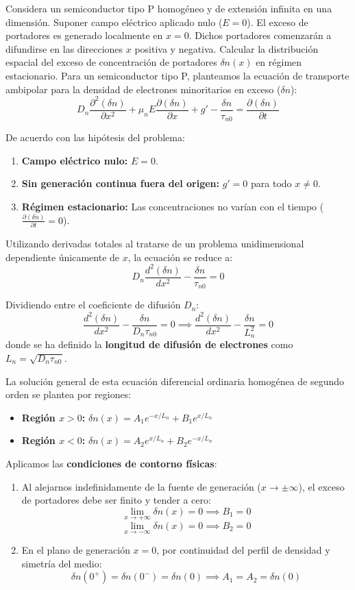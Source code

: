 \begin{ejemplo}
Considera un semiconductor tipo P homogéneo y de extensión infinita en una dimensión. Suponer campo eléctrico aplicado nulo ($E = 0$). El exceso de portadores es generado localmente en $x = 0$. Dichos portadores comenzarán a difundirse en las direcciones $x$ positiva y negativa. Calcular la distribución espacial del exceso de concentración de portadores $\delta n(x)$ en régimen estacionario.
\tcblower
Para un semiconductor tipo P, planteamos la ecuación de transporte ambipolar para la densidad de electrones minoritarios en exceso ($\delta n$):
\[
D_n \frac{\partial^2 (\delta n)}{\partial x^2} + \mu_n E \frac{\partial (\delta n)}{\partial x} + g' - \frac{\delta n}{\tau_{n0}} = \frac{\partial (\delta n)}{\partial t}
\]

De acuerdo con las hipótesis del problema:
\begin{enumerate}
    \item \textbf{Campo eléctrico nulo:} $E = 0$.
    \item \textbf{Sin generación continua fuera del origen:} $g' = 0$ para todo $x \neq 0$.
    \item \textbf{Régimen estacionario:} Las concentraciones no varían con el tiempo ($\frac{\partial (\delta n)}{\partial t} = 0$).
\end{enumerate}

Utilizando derivadas totales al tratarse de un problema unidimensional dependiente únicamente de $x$, la ecuación se reduce a:
\[
D_n \frac{d^2 (\delta n)}{dx^2} - \frac{\delta n}{\tau_{n0}} = 0
\]

Dividiendo entre el coeficiente de difusión $D_n$:
\[
\frac{d^2 (\delta n)}{dx^2} - \frac{\delta n}{D_n \tau_{n0}} = 0 \implies \frac{d^2 (\delta n)}{dx^2} - \frac{\delta n}{L_n^2} = 0
\]
donde se ha definido la \textbf{longitud de difusión de electrones} como $L_n = \sqrt{D_n \tau_{n0}}$.

La solución general de esta ecuación diferencial ordinaria homogénea de segundo orden se plantea por regiones:
\begin{itemize}
    \item \textbf{Región $x > 0$:} $\delta n(x) = A_1 e^{-x/L_n} + B_1 e^{x/L_n}$
    \item \textbf{Región $x < 0$:} $\delta n(x) = A_2 e^{x/L_n} + B_2 e^{-x/L_n}$
\end{itemize}

Aplicamos las \textbf{condiciones de contorno físicas}:
\begin{enumerate}
    \item Al alejarnos indefinidamente de la fuente de generación ($x \to \pm \infty$), el exceso de portadores debe ser finito y tender a cero:
    \[
    \lim_{x \to +\infty} \delta n(x) = 0 \implies B_1 = 0
    \]
    \[
    \lim_{x \to -\infty} \delta n(x) = 0 \implies B_2 = 0
    \]
    \item En el plano de generación $x = 0$, por continuidad del perfil de densidad y simetría del medio:
    \[
    \delta n(0^+) = \delta n(0^-) = \delta n(0) \implies A_1 = A_2 = \delta n(0)
    \]
\end{enumerate}


\end{ejemplo}
